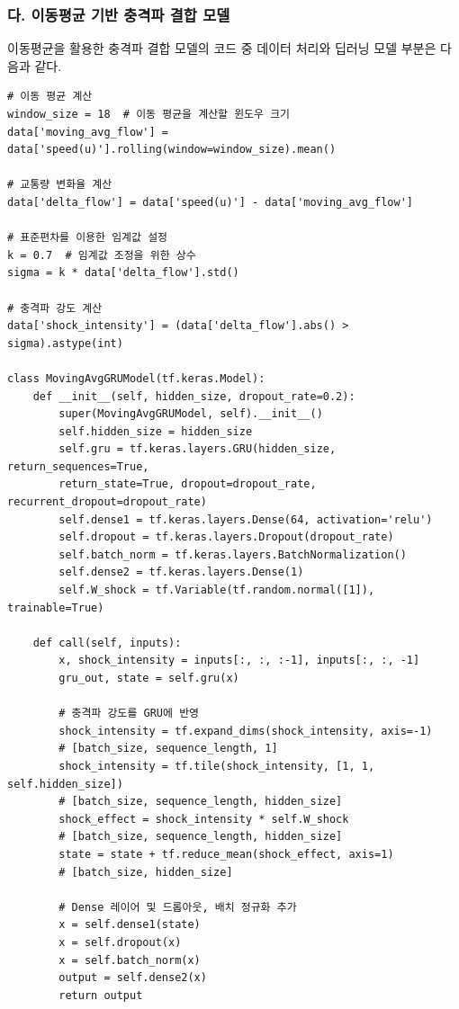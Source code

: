 \documentclass[11pt]{report}
\begin{document}
\subsubsection*{다. 이동평균 기반 충격파 결합 모델}
이동평균을 활용한 충격파 결합 모델의 코드 중 데이터 처리와 딥러닝 모델 부분은 다음과 같다. 

\begin{scriptsize}  %
\begin{verbatim}
# 이동 평균 계산
window_size = 18  # 이동 평균을 계산할 윈도우 크기
data['moving_avg_flow'] = data['speed(u)'].rolling(window=window_size).mean()

# 교통량 변화율 계산
data['delta_flow'] = data['speed(u)'] - data['moving_avg_flow']

# 표준편차를 이용한 임계값 설정
k = 0.7  # 임계값 조정을 위한 상수
sigma = k * data['delta_flow'].std()

# 충격파 강도 계산
data['shock_intensity'] = (data['delta_flow'].abs() > sigma).astype(int)

class MovingAvgGRUModel(tf.keras.Model):
    def __init__(self, hidden_size, dropout_rate=0.2):
        super(MovingAvgGRUModel, self).__init__()
        self.hidden_size = hidden_size
        self.gru = tf.keras.layers.GRU(hidden_size, return_sequences=True, 
		return_state=True, dropout=dropout_rate, recurrent_dropout=dropout_rate)
        self.dense1 = tf.keras.layers.Dense(64, activation='relu')
        self.dropout = tf.keras.layers.Dropout(dropout_rate)
        self.batch_norm = tf.keras.layers.BatchNormalization()
        self.dense2 = tf.keras.layers.Dense(1)
        self.W_shock = tf.Variable(tf.random.normal([1]), trainable=True)

    def call(self, inputs):
        x, shock_intensity = inputs[:, :, :-1], inputs[:, :, -1]
        gru_out, state = self.gru(x)

        # 충격파 강도를 GRU에 반영
        shock_intensity = tf.expand_dims(shock_intensity, axis=-1)  
		# [batch_size, sequence_length, 1]
        shock_intensity = tf.tile(shock_intensity, [1, 1, self.hidden_size])  
		# [batch_size, sequence_length, hidden_size]
        shock_effect = shock_intensity * self.W_shock  
		# [batch_size, sequence_length, hidden_size]
        state = state + tf.reduce_mean(shock_effect, axis=1)  
		# [batch_size, hidden_size]

        # Dense 레이어 및 드롭아웃, 배치 정규화 추가
        x = self.dense1(state)
        x = self.dropout(x)
        x = self.batch_norm(x)
        output = self.dense2(x)
        return output
\end{verbatim}
\end{scriptsize}
\end{document}
